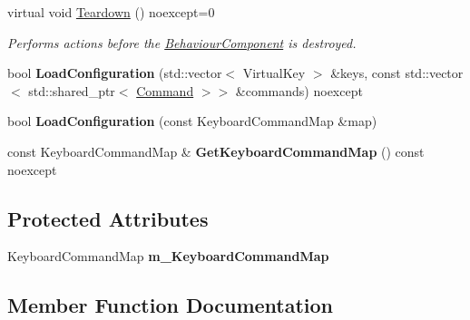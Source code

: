 \begin{DoxyCompactItemize}
virtual void \hyperlink{class_blade_1_1_keyboard_input_component_ae62cebd0c5fa0595460275060be472f4}{Teardown} () noexcept=0
\begin{DoxyCompactList}\small\item\em Performs actions before the \hyperlink{class_blade_1_1_behaviour_component}{Behaviour\+Component} is destroyed. \end{DoxyCompactList}\item 
\mbox{\label{class_blade_1_1_keyboard_input_component_a29dccb52007e5cac972a7af8aee18902}} 
bool {\bfseries Load\+Configuration} (std\+::vector$<$ Virtual\+Key $>$ \&keys, const std\+::vector$<$ std\+::shared\+\_\+ptr$<$ \hyperlink{class_blade_1_1_command}{Command} $>$$>$ \&commands) noexcept
\item 
\mbox{\label{class_blade_1_1_keyboard_input_component_ac254b07f58bf9bbe4b936883e113950e}} 
bool {\bfseries Load\+Configuration} (const Keyboard\+Command\+Map \&map)
\item 
\mbox{\label{class_blade_1_1_keyboard_input_component_aae293bcde0e7af3e72e0c5d4ee2fbddc}} 
const Keyboard\+Command\+Map \& {\bfseries Get\+Keyboard\+Command\+Map} () const noexcept
\end{DoxyCompactItemize}
\subsection*{Protected Attributes}
\begin{DoxyCompactItemize}
\item 
\mbox{\label{class_blade_1_1_keyboard_input_component_a80b0217398da60a1ccc37609f3c2928d}} 
Keyboard\+Command\+Map {\bfseries m\+\_\+\+Keyboard\+Command\+Map}
\end{DoxyCompactItemize}


\subsection{Member Function Documentation}
\mbox{\label{class_blade_1_1_keyboard_input_component_a0945515e8c0513eaa5b536fd4cb2022c}} 
